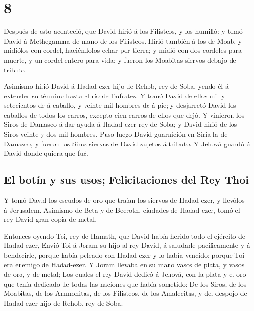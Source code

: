 \hypertarget{section-7}{%
\section{8}\label{section-7}}

 Después de esto aconteció, que David hirió á los Filisteos,
y los humilló: y tomó David á Methegamma de mano de los Filisteos.
 Hirió también á los de Moab, y midiólos con cordel,
haciéndolos echar por tierra; y midió con dos cordeles para muerte, y un
cordel entero para vida; y fueron los Moabitas siervos debajo de
tributo.

 Asimismo hirió David á Hadad-ezer hijo de Rehob, rey de
Soba, yendo él á extender su término hasta el río de Eufrates.
 Y tomó David de ellos mil y setecientos de á caballo, y
veinte mil hombres de á pie; y desjarretó David los caballos de todos
los carros, excepto cien carros de ellos que dejó.  Y
vinieron los Siros de Damasco á dar ayuda á Hadad-ezer rey de Soba; y
David hirió de los Siros veinte y dos mil hombres.  Puso
luego David guarnición en Siria la de Damasco, y fueron los Siros
siervos de David sujetos á tributo. Y Jehová guardó á David donde quiera
que fué.

\hypertarget{el-botuxedn-y-sus-usos-felicitaciones-del-rey-thoi}{%
\subsection{El botín y sus usos; Felicitaciones del Rey
Thoi}\label{el-botuxedn-y-sus-usos-felicitaciones-del-rey-thoi}}

 Y tomó David los escudos de oro que traían los siervos de
Hadad-ezer, y llevólos á Jerusalem.  Asimismo de Beta y de
Beeroth, ciudades de Hadad-ezer, tomó el rey David gran copia de metal.

 Entonces oyendo Toi, rey de Hamath, que David había herido
todo el ejército de Hadad-ezer,  Envió Toi á Joram su hijo
al rey David, á saludarle pacíficamente y á bendecirle, porque había
peleado con Hadad-ezer y lo había vencido: porque Toi era enemigo de
Hadad-ezer. Y Joram llevaba en su mano vasos de plata, y vasos de oro, y
de metal;  Los cuales el rey David dedicó á Jehová, con la
plata y el oro que tenía dedicado de todas las naciones que había
sometido:  De los Siros, de los Moabitas, de los Ammonitas,
de los Filisteos, de los Amalecitas, y del despojo de Hadad-ezer hijo de
Rehob, rey de Soba.

